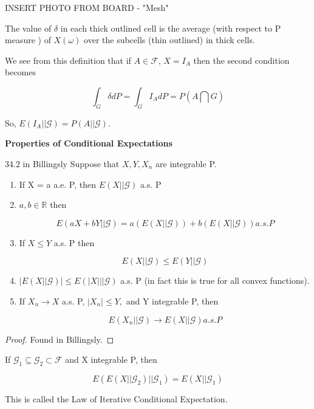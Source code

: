 \documentclass[11pt,fleqn]{book} %
\begin{document}
\begin{enumerate}
			INSERT PHOTO FROM BOARD - "Mesh"


	The value of $\delta$ in each thick outlined cell is the average (with respect to P measure ) of $X(\omega)$ over the subcells (thin outlined) in thick cells. 

	We see from this definition that if  $ A \in \mathcal{F}$, $X = I_A$ then the second condition becomes 

			$$\int_G \delta dP = \int_G I_A dP = P(A \bigcap G) $$

	So, $E(I_A||\mathcal{G}) = P(A || \mathcal{G})$. 

	\textbf{Properties of Conditional Expectations}\\

	\begin{theorem}{34.2 in Billingsly}
		Suppose that $X, Y, X_n$ are integrable P. 

			\begin{enumerate}
				\item If X = a a.e. P, then $E(X || \mathcal{G})$ a.s. P
				\item $a, b \in \mathbb{R}$ then

						$$E(aX + bY || \mathcal{G}) = a(E(X ||\mathcal{G})) + b(E(X || \mathcal{G})) a.s. P $$
				\item If $X \leq Y$ a.s. P then 

						$$E(X ||\mathcal{G}) \leq E(Y ||\mathcal{G}) $$
				\item $|E(X||\mathcal{G})| \leq E(|X| ||\mathcal{G})$ a.s. P (in fact this is true for all convex functions).
				\item If $X_n \rightarrow X$ a.s. P, $|X_n| \leq Y,$ and Y integrable P, then

						$$E(X_n ||\mathcal{G}) \rightarrow E(X ||\mathcal{G}) a.s. P $$
			\end{enumerate}

	\end{theorem}

	\begin{proof}
		Found in Billingsly. 
	\end{proof}

	\begin{theorem}[34.4 in Billingsly]
		If $\mathcal{G}_1 \subseteq \mathcal{G}_2 \subset \mathcal{F}$ and X integrable P, then

				$$E(E(X ||\mathcal{G}_2)|| \mathcal{G}_1) = E(X ||\mathcal{G}_1) $$

		This is called the Law of Iterative Conditional Expectation. 
	\end{theorem}


\end{enumerate}
\end{document}
